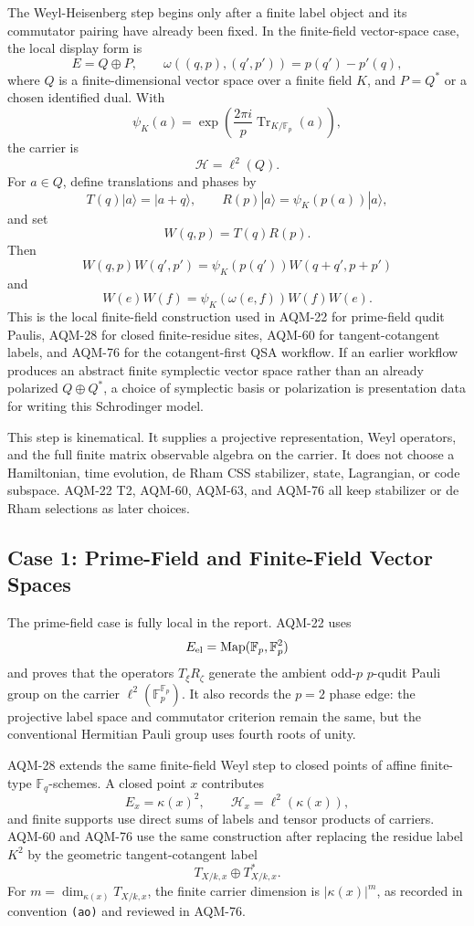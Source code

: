 The Weyl-Heisenberg step begins only after a finite label object and its
commutator pairing have already been fixed.  In the finite-field vector-space
case, the local display form is
\[
  E=Q\oplus P,\qquad \omega((q,p),(q',p'))=p(q')-p'(q),
\]
where \(Q\) is a finite-dimensional vector space over a finite field \(K\),
and \(P=Q^*\) or a chosen identified dual.  With
\[
  \psi_K(a)=
  \exp\!\left(\frac{2\pi i}{p}
    \operatorname{Tr}_{K/\mathbb F_p}(a)\right),
\]
the carrier is
\[
  \mathcal H=\ell^2(Q).
\]
For \(a\in Q\), define translations and phases by
\[
  T(q)|a\rangle=|a+q\rangle,\qquad
  R(p)|a\rangle=\psi_K(p(a))|a\rangle,
\]
and set
\[
  W(q,p)=T(q)R(p).
\]
Then
\[
  W(q,p)W(q',p')=\psi_K(p(q'))W(q+q',p+p')
\]
and
\[
  W(e)W(f)=\psi_K(\omega(e,f))W(f)W(e).
\]
This is the local finite-field construction used in AQM-22 for prime-field
qudit Paulis, AQM-28 for closed finite-residue sites, AQM-60 for
tangent-cotangent labels, and AQM-76 for the cotangent-first QSA workflow.
If an earlier workflow produces an abstract finite symplectic vector space
rather than an already polarized \(Q\oplus Q^*\), a choice of symplectic basis
or polarization is presentation data for writing this Schrodinger model.

This step is kinematical.  It supplies a projective representation, Weyl
operators, and the full finite matrix observable algebra on the carrier.
It does not choose a Hamiltonian, time evolution, de Rham CSS stabilizer,
state, Lagrangian, or code subspace.  AQM-22 T2, AQM-60, AQM-63, and AQM-76
all keep stabilizer or de Rham selections as later choices.

\subsection{Case 1: Prime-Field and Finite-Field Vector Spaces}

The prime-field case is fully local in the report.  AQM-22 uses
\[
  E_{\rm el}=\operatorname{Map}(\mathbb F_p,\mathbb F_p^2)
\]
and proves that the operators \(T_\xi R_\zeta\) generate the ambient
odd-\(p\) \(p\)-qudit Pauli group on the carrier
\(\ell^2(\mathbb F_p^{\mathbb F_p})\).  It also records the \(p=2\) phase
edge: the projective label space and commutator criterion remain the same,
but the conventional Hermitian Pauli group uses fourth roots of unity.

AQM-28 extends the same finite-field Weyl step to closed points of affine
finite-type \(\mathbb F_q\)-schemes.  A closed point \(x\) contributes
\[
  E_x=\kappa(x)^2,\qquad
  \mathcal H_x=\ell^2(\kappa(x)),
\]
and finite supports use direct sums of labels and tensor products of
carriers.  AQM-60 and AQM-76 use the same construction after replacing the
residue label \(K^2\) by the geometric tangent-cotangent label
\[
  T_{X/k,x}\oplus T^*_{X/k,x}.
\]
For \(m=\dim_{\kappa(x)}T_{X/k,x}\), the finite carrier dimension is
\(|\kappa(x)|^m\), as recorded in convention \texttt{(ao)} and reviewed in
AQM-76.

